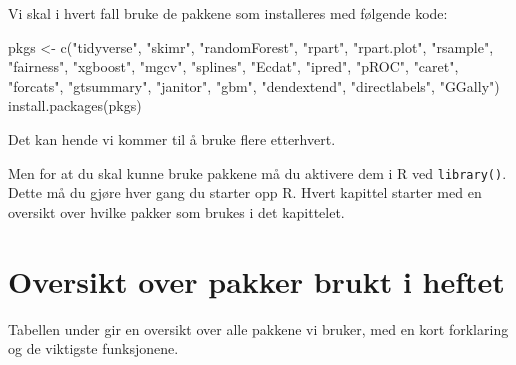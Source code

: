 \documentclass[
  letterpaper,
  DIV=11,
  numbers=noendperiod]{scrreprt}
\newenvironment{Shaded}{\begin{snugshade}}{\end{snugshade}}
\newcommand{\FunctionTok}[1]{\textcolor[rgb]{0.28,0.35,0.67}{#1}}
\newcommand{\NormalTok}[1]{\textcolor[rgb]{0.00,0.23,0.31}{#1}}
\newcommand{\OtherTok}[1]{\textcolor[rgb]{0.00,0.23,0.31}{#1}}
\newcommand{\StringTok}[1]{\textcolor[rgb]{0.13,0.47,0.30}{#1}}
\begin{document}
Vi skal i hvert fall bruke de pakkene som installeres med følgende kode:

\begin{Shaded}
\begin{Highlighting}[]
\NormalTok{pkgs }\OtherTok{\textless{}{-}} \FunctionTok{c}\NormalTok{(}\StringTok{"tidyverse"}\NormalTok{, }\StringTok{"skimr"}\NormalTok{, }\StringTok{"randomForest"}\NormalTok{, }\StringTok{"rpart"}\NormalTok{, }\StringTok{"rpart.plot"}\NormalTok{,}
           \StringTok{"rsample"}\NormalTok{, }\StringTok{"fairness"}\NormalTok{, }\StringTok{"xgboost"}\NormalTok{, }\StringTok{"mgcv"}\NormalTok{, }\StringTok{"splines"}\NormalTok{, }\StringTok{"Ecdat"}\NormalTok{,}
           \StringTok{"ipred"}\NormalTok{, }\StringTok{"pROC"}\NormalTok{, }\StringTok{"caret"}\NormalTok{, }\StringTok{"forcats"}\NormalTok{, }\StringTok{"gtsummary"}\NormalTok{, }\StringTok{"janitor"}\NormalTok{,}
           \StringTok{"gbm"}\NormalTok{, }\StringTok{"dendextend"}\NormalTok{, }\StringTok{"directlabels"}\NormalTok{, }\StringTok{"GGally"}\NormalTok{)}
\FunctionTok{install.packages}\NormalTok{(pkgs)}
\end{Highlighting}
\end{Shaded}

Det kan hende vi kommer til å bruke flere etterhvert.

Men for at du skal kunne bruke pakkene må du aktivere dem i R ved
\texttt{library()}. Dette må du gjøre hver gang du starter opp R. Hvert
kapittel starter med en oversikt over hvilke pakker som brukes i det
kapittelet.

\section*{Oversikt over pakker brukt i
heftet}\label{oversikt-over-pakker-brukt-i-heftet}


Tabellen under gir en oversikt over alle pakkene vi bruker, med en kort
forklaring og de viktigste funksjonene.
\end{document}
